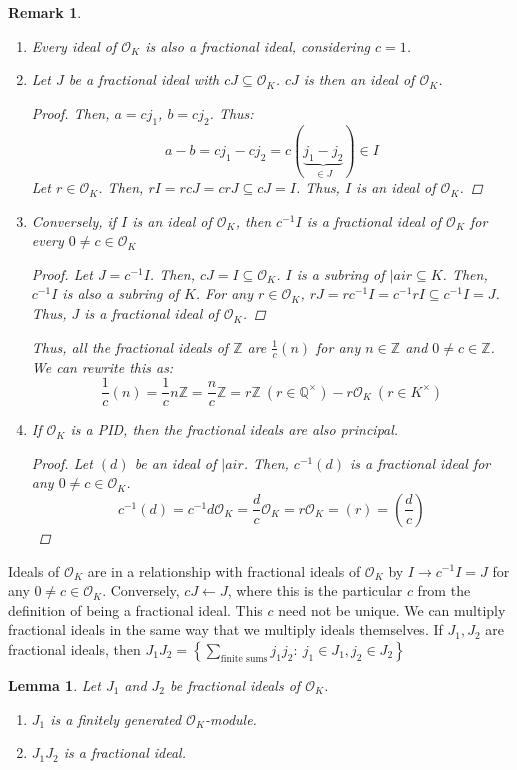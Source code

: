 \documentclass{article}
\newcommand{\air}{\mathcal{O}_K}
\newcommand{\Q}{\mathbb{Q}}
\newcommand{\Z}{\mathbb{Z}}
\newtheorem{remark}{Remark}[subsection]
\newtheorem{lemma}{Lemma}[subsection]
\begin{document}
\begin{remark}
\begin{enumerate}
    \item Every ideal of $\air$ is also a fractional ideal, considering $c=1$.
    \item Let $J$ be a fractional ideal with $cJ\subseteq \air$. $cJ$ is then an ideal of $\air$. \begin{proof} Then, $a=cj_1$, $b=cj_2$. Thus:
    $$a-b=cj_1-cj_2 = c(\underbrace{j_1-j_2}_{\in J})\in I$$
    Let $r\in \air$. Then, $rI=rcJ = crJ \subseteq cJ = I$. Thus, $I$ is an ideal of $\air$.
    \end{proof}
    \item Conversely, if $I$ is an ideal of $\air$, then $c^{-1}I$ is a fractional ideal of $\air$ for every $0\neq c\in\air$
    \begin{proof}
    Let $J=c^{-1}I$. Then, $cJ=I\subseteq\air$. $I$ is a subring of $|air\subseteq K$. Then, $c^{-1}I$ is also a subring of $K$. For any $r\in\air$, $rJ = rc^{-1}I=c^{-1}rI\subseteq c^{-1}I=J$. Thus, $J$ is a fractional ideal of $\air$.
    \end{proof}
Thus, all the fractional ideals of $\Z$ are $\frac{1}{c}(n)$ for any $n\in\Z$ and $0\neq c\in \Z$. We can rewrite this as:
$$\frac{1}{c}(n)=\frac{1}{c}n\Z = \frac{n}{c}\Z= r\Z\ (r\in\Q^\times) - r\air\ (r\in K^\times)$$
\newpage
\item If $\air$ is a PID, then the fractional ideals are also principal.
\begin{proof}
Let $(d)$ be an ideal of $|air$. Then, $c^{-1}(d)$ is a fractional ideal for any $0\neq c\in\air$.
$$c^{-1}(d)=c^{-1}d\air = \frac{d}{c}\air = \boxed{r\air} = (r)= \left(\frac{d}{c}\right)$$
\end{proof}
\end{enumerate}
\end{remark}
Ideals of $\air$ are in a relationship with fractional ideals of $\air$ by $I\rightarrow c^{-1}I=J$ for any $0\neq c\in\air$. Conversely, $cJ\leftarrow J$, where this is the particular $c$ from the definition of being a fractional ideal. This $c$ need not be unique. We can multiply fractional ideals in the same way that we multiply ideals themselves. If $J_1,J_2$ are fractional ideals, then $J_1J_2=\left\{\displaystyle\sum_{\text{finite sums}}j_1j_2:\ j_1\in J_1, j_2\in J_2\right\}$ 
\begin{lemma}
Let $J_1$ and $J_2$ be fractional ideals of $\air$. 
\begin{enumerate}
    \item $J_1$ is a finitely generated $\air$-module.
    \item $J_1J_2$ is a fractional ideal.
\end{enumerate}
\end{lemma}
\end{document}
